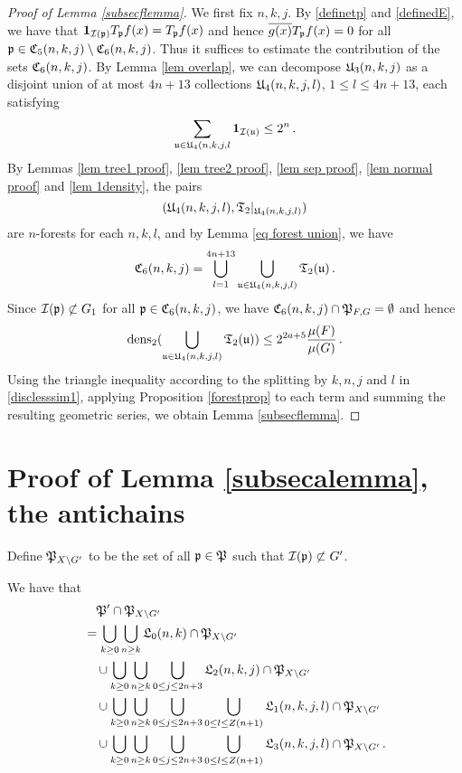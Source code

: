 \begin{proof}[Proof of Lemma \ref{subsecflemma}]
    We first fix $n, k, j$.
    By \eqref{definetp} and \eqref{definedE}, we have that
    $\mathbf{1}_{\mathcal{I}(\mathfrak p)} T_{\mathfrak p}f(x) = T_{\mathfrak p}f(x)$ and hence $\overline{g(x)} T_{\mathfrak p}f(x)= 0$ for all $\mathfrak p \in \mathfrak C_5(n,k,j) \setminus \mathfrak C_6(n,k,j)$.
    Thus it suffices to estimate the contribution of the sets $\mathfrak C_6(n,k,j)$. By Lemma \ref{lem overlap}, we can decompose $\mathfrak U_3(n,k,j)$ as a disjoint union of at most $4n + 13$ collections $\mathfrak U_4(n,k,j,l)$, $1 \le l \le 4n+13$, each satisfying
    $$
        \sum_{\mathfrak u \in \mathfrak U_4(n,k,j,l} \mathbf{1}_{\mathcal{I}(\mathfrak u)} \le 2^n\,.
    $$
    By Lemmas \ref{lem tree1 proof}, \ref{lem tree2 proof}, \ref{lem sep proof}, \ref{lem normal proof} and \ref{lem 1density}, the pairs
    $$
        (\mathfrak U_4(n,k,j,l), \mathfrak{T}_2|_{\mathfrak U_4(n,k,j,l)})
    $$
    are $n$-forests for each $n,k,l$, and by Lemma \ref{eq forest union}, we have
    $$
        \mathfrak C_6(n,k,j) = \bigcup_{l = 1}^{4n + 13} \bigcup_{\mathfrak u \in \mathfrak U_4(n,k,j,l)} \mathfrak{T}_2(\mathfrak u)\,.
    $$
    Since $\mathcal{I}(\mathfrak p) \not\subset G_1$ for all $\mathfrak p \in \mathfrak C_6(n,k,j)$, we have $\mathfrak C_6(n,k,j) \cap \mathfrak P_{F,G} = \emptyset$ and hence
    $$
        \operatorname{\operatorname{dens}}_2(\bigcup_{\mathfrak u \in \mathfrak U_4(n,k,j,l)} \mathfrak{T}_2(\mathfrak u)) \le 2^{2a + 5} \frac{\mu(F)}{\mu(G)}\,.
    $$
    Using the triangle inequality according to the splitting by $k,n,j$ and $l$ in \eqref{disclesssim1}, applying Proposition \ref{forestprop} to each term and summing the resulting geometric series, we obtain Lemma \ref{subsecflemma}.
\end{proof}

\section{Proof of Lemma \ref{subsecalemma}, the antichains}
\label{subsecantichain}

Define $\mathfrak P_{X \setminus G'}$ to be the set of all $\mathfrak p \in \mathfrak P$ such that $\mathcal{I}(\mathfrak p) \not \subset G'$.
\begin{lemma}
    We have that
    \begin{align}
        \label{eq fp' decomposition}
        &\quad \mathfrak P' \cap \mathfrak P_{X \setminus G'}\\
        &=  \bigcup_{k \ge 0} \bigcup_{n \ge k} \mathfrak L_0(n,k) \cap \mathfrak P_{X \setminus G'} \\
        &\quad\cup \bigcup_{k \ge 0} \bigcup_{n \ge k}\bigcup_{0 \le j \le 2n+3} \mathfrak L_2(n,k,j) \cap \mathfrak P_{X \setminus G'}\\
        &\quad\cup  \bigcup_{k \ge 0} \bigcup_{n \ge k}\bigcup_{0 \le j \le 2n+3} \bigcup_{0 \le l \le Z(n+1)} \mathfrak L_1(n,k,j,l) \cap \mathfrak P_{X \setminus G'}\\
        &\quad\cup  \bigcup_{k \ge 0} \bigcup_{n \ge k}\bigcup_{0 \le j \le 2n+3} \bigcup_{0 \le l \le Z(n+1)}  \mathfrak L_3(n,k,j,l)\cap \mathfrak P_{X \setminus G'}\,.
    \end{align}
\end{lemma}

